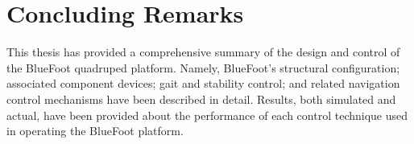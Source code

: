 \chapter{Concluding Remarks}

This thesis has provided a comprehensive summary of the design and control of the BlueFoot quadruped platform. Namely, BlueFoot's structural configuration; associated component devices; gait and stability control; and related navigation control mechanisms have been described in detail. Results, both simulated and actual, have been provided about the performance of each control technique used in operating the BlueFoot platform.